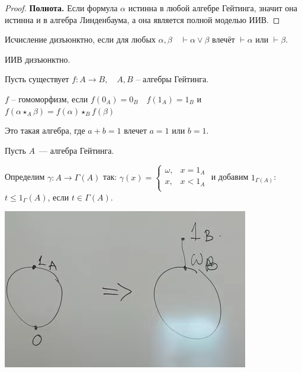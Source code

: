 \begin{proof}
    \textbf{Полнота.} Если формула $\alpha$ истинна в любой алгебре Гейтинга, значит она истинна и в алгебра Линденбаума, а она является полной моделью ИИВ.
\end{proof}

\begin{definition}
    Исчисление дизъюнктно, если для любых $\alpha, \beta\quad \vdash \alpha \lor \beta$ влечёт $\vdash \alpha$ или $\vdash \beta$.
\end{definition}

\begin{theorem}
    ИИВ дизъюнктно.
\end{theorem}

\begin{definition}
    Пусть существует $f: A \to B, \quad A, B$ -- алгебры Гейтинга.

    $f$ -- гомоморфизм, если $f(0_A) = 0_B\quad f(1_A) = 1_B$ и $f(\alpha \star_A \beta) = f(\alpha) \star_B f(\beta)$
\end{definition}

\begin{definition}
    Это такая алгебра, где $a + b = 1$ влечет $a = 1$ или $b = 1$.
\end{definition}

\begin{definition}
    [$\Gamma (A)$]
    Пусть $A$~--- алгебра Гейтинга.

    Определим $\gamma: A \to \Gamma(A)$ так:
    $\gamma(x) = \begin{cases}
        \omega, &x = 1_A\\
        x, & x < 1_A\\
    \end{cases}$
    и добавим $1_{\Gamma(A)}$: $t \leqslant 1_\Gamma(A)$, если $t \in \Gamma(A)$.

    \begin{center}
        \includegraphics[scale=0.5]{img/gedelerisation.png}
    \end{center}
\end{definition}

